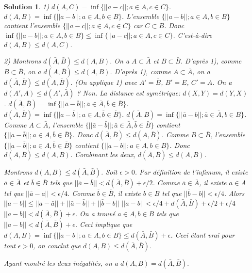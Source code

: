 \documentclass{article}
\newtheorem{solution}{Solution}
\begin{document}
\begin{solution}
1) $d(A, C) = \inf \{ ||a-c|| ; a \in A, c \in C \}$.
$d(A, B) = \inf \{ ||a-b|| ; a \in A, b \in B \}$.
L'ensemble $\{ ||a-b|| ; a \in A, b \in B \}$ contient l'ensemble $\{ ||a-c|| ; a \in A, c \in C \}$ car $C \subset B$.
Donc $\inf \{ ||a-b|| ; a \in A, b \in B \} \le \inf \{ ||a-c|| ; a \in A, c \in C \}$.
C'est-à-dire $d(A, B) \le d(A, C)$.

2) Montrons $d(\bar{A}, \bar{B}) \le d(A, B)$.
On a $A \subset \bar{A}$ et $B \subset \bar{B}$.
D'après 1), comme $B \subset \bar{B}$, on a $d(A, \bar{B}) \le d(A, B)$.
D'après 1), comme $A \subset \bar{A}$, on a $d(\bar{A}, \bar{B}) \le d(A, \bar{B})$.
(On applique 1) avec $A'=\bar{B}$, $B'=E$, $C'=A$. On a $d(A', A) \le d(A', \bar{A})$ ? Non.
La distance est symétrique: $d(X,Y)=d(Y,X)$.
$d(\bar{A}, \bar{B}) = \inf \{ ||\bar{a}-\bar{b}|| ; \bar{a} \in \bar{A}, \bar{b} \in \bar{B} \}$.
$d(A, \bar{B}) = \inf \{ ||a-\bar{b}|| ; a \in A, \bar{b} \in \bar{B} \}$.
$d(\bar{A}, B) = \inf \{ ||\bar{a}-b|| ; \bar{a} \in \bar{A}, b \in B \}$.
Comme $A \subset \bar{A}$, l'ensemble $\{ ||\bar{a}-\bar{b}|| ; \bar{a} \in \bar{A}, \bar{b} \in \bar{B} \}$ contient $\{ ||a-\bar{b}|| ; a \in A, \bar{b} \in \bar{B} \}$.
Donc $d(\bar{A}, \bar{B}) \le d(A, \bar{B})$.
Comme $B \subset \bar{B}$, l'ensemble $\{ ||a-\bar{b}|| ; a \in A, \bar{b} \in \bar{B} \}$ contient $\{ ||a-b|| ; a \in A, b \in B \}$.
Donc $d(A, \bar{B}) \le d(A, B)$.
Combinant les deux, $d(\bar{A}, \bar{B}) \le d(A, B)$.

Montrons $d(A, B) \le d(\bar{A}, \bar{B})$.
Soit $\epsilon > 0$. Par définition de l'infimum, il existe $\bar{a} \in \bar{A}$ et $\bar{b} \in \bar{B}$ tels que $||\bar{a}-\bar{b}|| < d(\bar{A}, \bar{B}) + \epsilon/2$.
Comme $\bar{a} \in \bar{A}$, il existe $a \in A$ tel que $||\bar{a}-a|| < \epsilon/4$.
Comme $\bar{b} \in \bar{B}$, il existe $b \in B$ tel que $||\bar{b}-b|| < \epsilon/4$.
Alors $||a-b|| \le ||a-\bar{a}|| + ||\bar{a}-\bar{b}|| + ||\bar{b}-b||$
$||a-b|| < \epsilon/4 + d(\bar{A}, \bar{B}) + \epsilon/2 + \epsilon/4$
$||a-b|| < d(\bar{A}, \bar{B}) + \epsilon$.
On a trouvé $a \in A, b \in B$ tels que $||a-b|| < d(\bar{A}, \bar{B}) + \epsilon$.
Ceci implique que $d(A, B) = \inf \{ ||a-b|| ; a \in A, b \in B \} \le d(\bar{A}, \bar{B}) + \epsilon$.
Ceci étant vrai pour tout $\epsilon > 0$, on conclut que $d(A, B) \le d(\bar{A}, \bar{B})$.

Ayant montré les deux inégalités, on a $d(A, B) = d(\bar{A}, \bar{B})$.
\end{solution}
\end{document}
